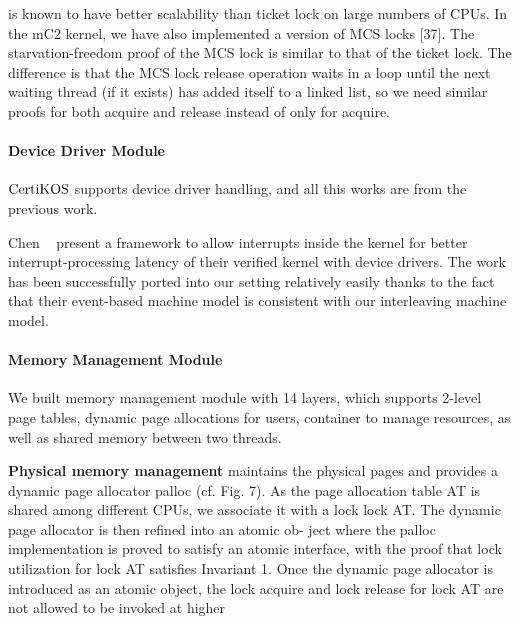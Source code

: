is known to have better scalability than ticket lock on large numbers of CPUs. In the mC2 kernel, we have also implemented a version of MCS locks [37]. The starvation-freedom proof of the MCS lock is similar to that of the ticket lock. The difference is that the MCS lock release operation waits in a loop until the next waiting thread (if it exists) has added itself to a linked list, so we need similar proofs for both acquire and release instead of only for acquire.


\paragraph{Device Driver Module}

$\mathrm{CertiKOS}$ supports device driver handling, and all this works are from the previous work.

 Chen \etal~
 present a framework to allow interrupts inside the kernel for better interrupt-processing latency of their verified kernel with device drivers. The work has been successfully ported into our setting relatively easily thanks to the fact that their event-based machine model is consistent with our interleaving machine model.
 

\paragraph{Memory Management Module}

We built memory management module with 14 layers, 
which supports 2-level page tables, dynamic page allocations for users, 
container to manage resources, 
as well as shared memory between two threads. 

\textbf{Physical memory management} maintains the physical pages and provides a dynamic page allocator palloc (cf. Fig. 7). As the page allocation table AT is shared among different CPUs, we associate it with a lock lock AT. The dynamic page allocator is then refined into an atomic ob- ject where the palloc implementation is proved to satisfy an atomic interface, with the proof that lock utilization for lock AT satisfies Invariant 1. Once the dynamic page allocator is introduced as an atomic object, the lock acquire and lock release for lock AT are not allowed to be invoked at higher

